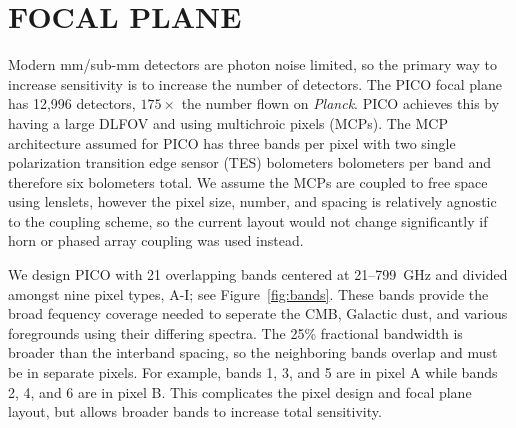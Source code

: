 \documentclass[]{spie}  %
\begin{document}
%
%

\section{FOCAL PLANE}
\label{sec:focalplane}

Modern mm/sub-mm detectors are photon noise limited, so the primary way to increase sensitivity is to increase the number of detectors. 
The PICO focal plane has 12,996 detectors, $175\times$ the number flown on \textit{Planck}. PICO achieves this by having a large DLFOV and using 
multichroic pixels (MCPs)\cite{Suzuki2014_samps}.  
The MCP architecture assumed for PICO has three bands per pixel with two single polarization transition 
edge sensor (TES) bolometers bolometers per band and therefore six bolometers total. 
We assume the MCPs are coupled to free space using lenslets\cite{Suzuki2014_samps}, however the pixel size, number, and spacing is 
relatively agnostic to the coupling scheme, so the current layout would not change significantly if horn or phased array coupling was used 
instead.

We design PICO with 21 overlapping bands centered at 21--799~GHz and divided amongst nine pixel types, A-I; see Figure~\ref{fig:bands}. 
These bands provide the broad fequency coverage needed to seperate the CMB, Galactic dust, and various foregrounds using their differing spectra.  
The 25\% fractional bandwidth is broader than the interband spacing, so the neighboring bands overlap and must be in separate pixels.  
For example, bands 1, 3, and 5 are in pixel A while bands 2, 4, and 6 are in pixel B.  This 
complicates the pixel design and focal plane layout, but allows broader bands to increase total sensitivity.  
\end{document}
